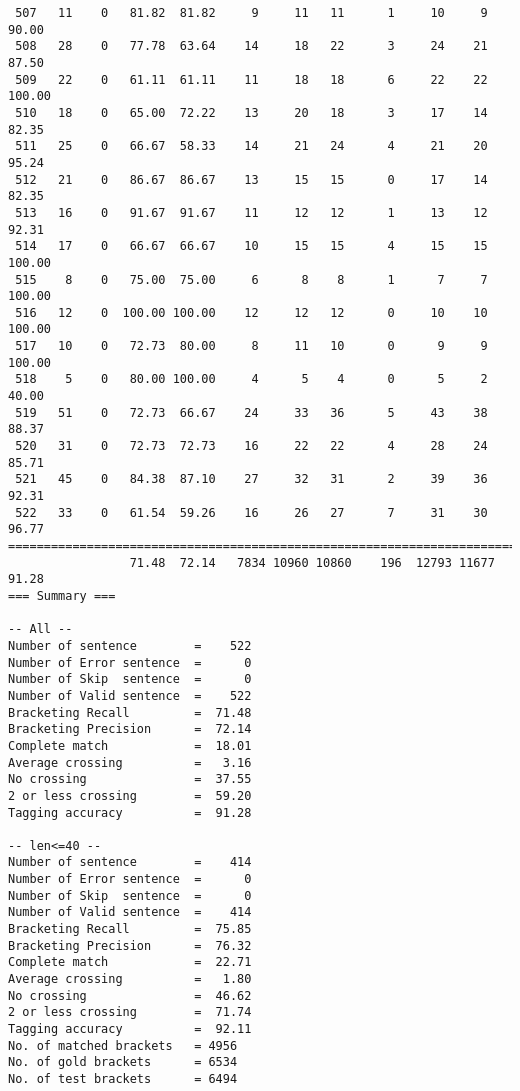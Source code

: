 \begin{verbatim}
 507   11    0   81.82  81.82     9     11   11      1     10     9    90.00
 508   28    0   77.78  63.64    14     18   22      3     24    21    87.50
 509   22    0   61.11  61.11    11     18   18      6     22    22   100.00
 510   18    0   65.00  72.22    13     20   18      3     17    14    82.35
 511   25    0   66.67  58.33    14     21   24      4     21    20    95.24
 512   21    0   86.67  86.67    13     15   15      0     17    14    82.35
 513   16    0   91.67  91.67    11     12   12      1     13    12    92.31
 514   17    0   66.67  66.67    10     15   15      4     15    15   100.00
 515    8    0   75.00  75.00     6      8    8      1      7     7   100.00
 516   12    0  100.00 100.00    12     12   12      0     10    10   100.00
 517   10    0   72.73  80.00     8     11   10      0      9     9   100.00
 518    5    0   80.00 100.00     4      5    4      0      5     2    40.00
 519   51    0   72.73  66.67    24     33   36      5     43    38    88.37
 520   31    0   72.73  72.73    16     22   22      4     28    24    85.71
 521   45    0   84.38  87.10    27     32   31      2     39    36    92.31
 522   33    0   61.54  59.26    16     26   27      7     31    30    96.77
============================================================================
                 71.48  72.14   7834 10960 10860    196  12793 11677    91.28
=== Summary ===

-- All --
Number of sentence        =    522
Number of Error sentence  =      0
Number of Skip  sentence  =      0
Number of Valid sentence  =    522
Bracketing Recall         =  71.48
Bracketing Precision      =  72.14
Complete match            =  18.01
Average crossing          =   3.16
No crossing               =  37.55
2 or less crossing        =  59.20
Tagging accuracy          =  91.28

-- len<=40 --
Number of sentence        =    414
Number of Error sentence  =      0
Number of Skip  sentence  =      0
Number of Valid sentence  =    414
Bracketing Recall         =  75.85
Bracketing Precision      =  76.32
Complete match            =  22.71
Average crossing          =   1.80
No crossing               =  46.62
2 or less crossing        =  71.74
Tagging accuracy          =  92.11
No. of matched brackets   = 4956
No. of gold brackets      = 6534
No. of test brackets      = 6494

\end{verbatim}

\normalsize

